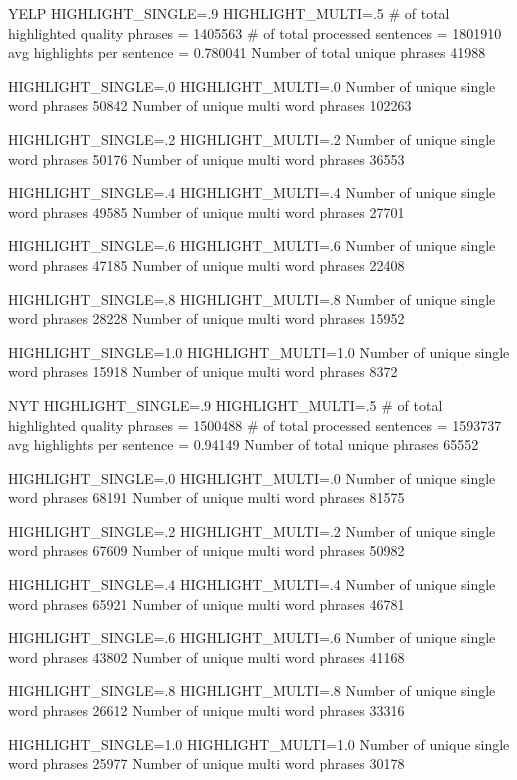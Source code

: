 YELP 
HIGHLIGHT_SINGLE=.9
HIGHLIGHT_MULTI=.5
# of total highlighted quality phrases = 1405563
   # of total processed sentences = 1801910
   avg highlights per sentence = 0.780041
   Number of total unique phrases 41988

HIGHLIGHT_SINGLE=.0
HIGHLIGHT_MULTI=.0
Number of unique single word phrases 50842
Number of unique multi word phrases 102263

HIGHLIGHT_SINGLE=.2
HIGHLIGHT_MULTI=.2
Number of unique single word phrases 50176
Number of unique multi word phrases 36553

HIGHLIGHT_SINGLE=.4
HIGHLIGHT_MULTI=.4
Number of unique single word phrases 49585
Number of unique multi word phrases 27701

HIGHLIGHT_SINGLE=.6
HIGHLIGHT_MULTI=.6
Number of unique single word phrases 47185
Number of unique multi word phrases 22408

HIGHLIGHT_SINGLE=.8
HIGHLIGHT_MULTI=.8
Number of unique single word phrases 28228
Number of unique multi word phrases 15952

HIGHLIGHT_SINGLE=1.0
HIGHLIGHT_MULTI=1.0
Number of unique single word phrases 15918
Number of unique multi word phrases 8372


NYT
HIGHLIGHT_SINGLE=.9
HIGHLIGHT_MULTI=.5
# of total highlighted quality phrases = 1500488
   # of total processed sentences = 1593737
   avg highlights per sentence = 0.94149
   Number of total unique phrases 65552

HIGHLIGHT_SINGLE=.0
HIGHLIGHT_MULTI=.0
Number of unique single word phrases 68191
Number of unique multi word phrases 81575

HIGHLIGHT_SINGLE=.2
HIGHLIGHT_MULTI=.2
Number of unique single word phrases 67609
Number of unique multi word phrases 50982

HIGHLIGHT_SINGLE=.4
HIGHLIGHT_MULTI=.4
Number of unique single word phrases 65921
Number of unique multi word phrases 46781

HIGHLIGHT_SINGLE=.6
HIGHLIGHT_MULTI=.6
Number of unique single word phrases 43802
Number of unique multi word phrases 41168

HIGHLIGHT_SINGLE=.8
HIGHLIGHT_MULTI=.8
Number of unique single word phrases 26612
Number of unique multi word phrases 33316

HIGHLIGHT_SINGLE=1.0
HIGHLIGHT_MULTI=1.0
Number of unique single word phrases 25977
Number of unique multi word phrases 30178